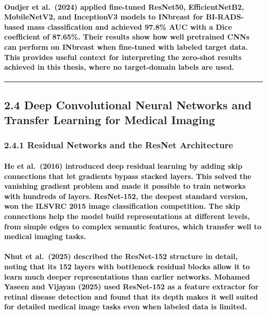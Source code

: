 \paragraph{Oudjer et al. (2024) applied fine-tuned ResNet50, EfficientNetB2, MobileNetV2, and InceptionV3 models to INbreast for BI-RADS-based mass classification and achieved 97.8\% AUC with a Dice coefficient of 87.65\%. Their results show how well pretrained CNNs can perform on INbreast when fine-tuned with labeled target data. This provides useful context for interpreting the zero-shot results achieved in this thesis, where no target-domain labels are used.}

\begin{center}\rule{0.5\linewidth}{0.5pt}\end{center}

\subsection{2.4 Deep Convolutional Neural Networks and Transfer Learning
for Medical
Imaging}\label{deep-convolutional-neural-networks-and-transfer-learning-for-medical-imaging}

\subsubsection{2.4.1 Residual Networks and the ResNet
Architecture}\label{residual-networks-and-the-resnet-architecture}

\paragraph{He et al. (2016) introduced deep residual learning by adding skip connections that let gradients bypass stacked layers. This solved the vanishing gradient problem and made it possible to train networks with hundreds of layers. ResNet-152, the deepest standard version, won the ILSVRC 2015 image classification competition. The skip connections help the model build representations at different levels, from simple edges to complex semantic features, which transfer well to medical imaging tasks.}

\paragraph{Nhut et al. (2025) described the ResNet-152 structure in detail, noting that its 152 layers with bottleneck residual blocks allow it to learn much deeper representations than earlier networks. Mohamed Yaseen and Vijayan (2025) used ResNet-152 as a feature extractor for retinal disease detection and found that its depth makes it well suited for detailed medical image tasks even when labeled data is limited.}

